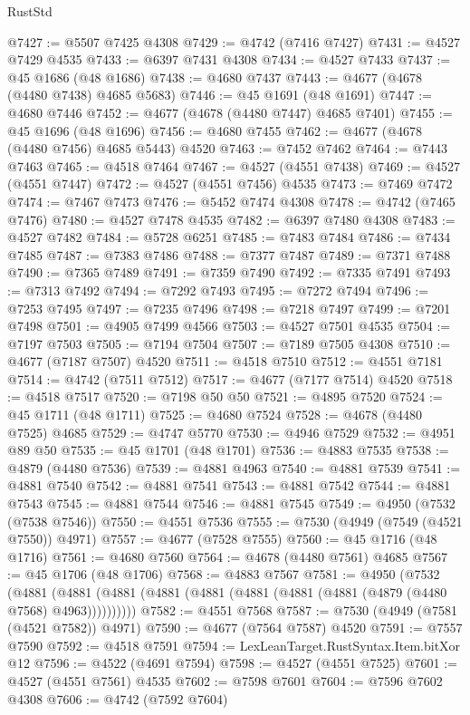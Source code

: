 \begin{lexlean}{RustStd}
\begin{coremodule}
@7427 := @5507 @7425 @4308
@7429 := @4742 (@7416 @7427)
@7431 := @4527 @7429 @4535
@7433 := @6397 @7431 @4308
@7434 := @4527 @7433
@7437 := @45 @1686 (@48 @1686)
@7438 := @4680 @7437
@7443 := @4677 (@4678 (@4480 @7438) @4685 @5683)
@7446 := @45 @1691 (@48 @1691)
@7447 := @4680 @7446
@7452 := @4677 (@4678 (@4480 @7447) @4685 @7401)
@7455 := @45 @1696 (@48 @1696)
@7456 := @4680 @7455
@7462 := @4677 (@4678 (@4480 @7456) @4685 @5443) @4520
@7463 := @7452 @7462
@7464 := @7443 @7463
@7465 := @4518 @7464
@7467 := @4527 (@4551 @7438)
@7469 := @4527 (@4551 @7447)
@7472 := @4527 (@4551 @7456) @4535
@7473 := @7469 @7472
@7474 := @7467 @7473
@7476 := @5452 @7474 @4308
@7478 := @4742 (@7465 @7476)
@7480 := @4527 @7478 @4535
@7482 := @6397 @7480 @4308
@7483 := @4527 @7482
@7484 := @5728 @6251
@7485 := @7483 @7484
@7486 := @7434 @7485
@7487 := @7383 @7486
@7488 := @7377 @7487
@7489 := @7371 @7488
@7490 := @7365 @7489
@7491 := @7359 @7490
@7492 := @7335 @7491
@7493 := @7313 @7492
@7494 := @7292 @7493
@7495 := @7272 @7494
@7496 := @7253 @7495
@7497 := @7235 @7496
@7498 := @7218 @7497
@7499 := @7201 @7498
@7501 := @4905 @7499 @4566
@7503 := @4527 @7501 @4535
@7504 := @7197 @7503
@7505 := @7194 @7504
@7507 := @7189 @7505 @4308
@7510 := @4677 (@7187 @7507) @4520
@7511 := @4518 @7510
@7512 := @4551 @7181
@7514 := @4742 (@7511 @7512)
@7517 := @4677 (@7177 @7514) @4520
@7518 := @4518 @7517
@7520 := @7198 @50 @50
@7521 := @4895 @7520
@7524 := @45 @1711 (@48 @1711)
@7525 := @4680 @7524
@7528 := @4678 (@4480 @7525) @4685
@7529 := @4747 @5770
@7530 := @4946 @7529
@7532 := @4951 @89 @50
@7535 := @45 @1701 (@48 @1701)
@7536 := @4883 @7535
@7538 := @4879 (@4480 @7536)
@7539 := @4881 @4963
@7540 := @4881 @7539
@7541 := @4881 @7540
@7542 := @4881 @7541
@7543 := @4881 @7542
@7544 := @4881 @7543
@7545 := @4881 @7544
@7546 := @4881 @7545
@7549 := @4950 (@7532 (@7538 @7546))
@7550 := @4551 @7536
@7555 := @7530 (@4949 (@7549 (@4521 @7550)) @4971)
@7557 := @4677 (@7528 @7555)
@7560 := @45 @1716 (@48 @1716)
@7561 := @4680 @7560
@7564 := @4678 (@4480 @7561) @4685
@7567 := @45 @1706 (@48 @1706)
@7568 := @4883 @7567
@7581 := @4950
    (@7532
      (@4881 (@4881 (@4881 (@4881 (@4881 (@4881 (@4881 (@4881 (@4879 (@4480 @7568) @4963))))))))))
@7582 := @4551 @7568
@7587 := @7530 (@4949 (@7581 (@4521 @7582)) @4971)
@7590 := @4677 (@7564 @7587) @4520
@7591 := @7557 @7590
@7592 := @4518 @7591
@7594 := LexLeanTarget.RustSyntax.Item.bitXor @12
@7596 := @4522 (@4691 @7594)
@7598 := @4527 (@4551 @7525)
@7601 := @4527 (@4551 @7561) @4535
@7602 := @7598 @7601
@7604 := @7596 @7602 @4308
@7606 := @4742 (@7592 @7604)

\end{coremodule}
\end{lexlean}

